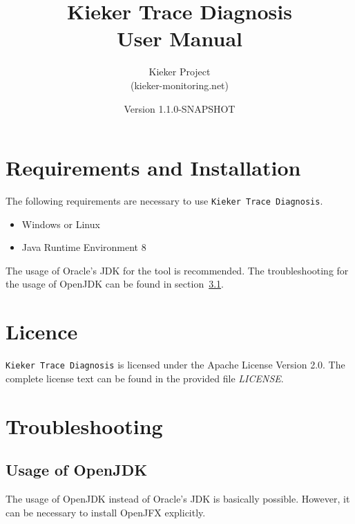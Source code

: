\documentclass{article}
\title{Kieker Trace Diagnosis\\User Manual}
\date{Version 1.1.0-SNAPSHOT}
\author{Kieker Project\\(kieker-monitoring.net)}
\begin{document}
  \newcommand{\KiekerTraceDiagnosis}[0]{\texttt{Kieker Trace Diagnosis}}
  \newcommand{\file}[1]{\textit{#1}}

  \maketitle

  \section{Requirements and Installation}
  The following requirements are necessary to use \KiekerTraceDiagnosis{}.
  \begin{itemize}
    \item Windows or Linux
    \item Java Runtime Environment 8
  \end{itemize}
  The usage of Oracle's JDK for the tool is recommended. The troubleshooting for the usage of OpenJDK can be found in section~\ref{OpenJDK}.

  \section{Licence}
  \KiekerTraceDiagnosis{} is licensed under the Apache License Version 2.0. The complete license text can be found in the provided file \file{LICENSE}.

  \section{Troubleshooting}

  \subsection{Usage of OpenJDK}\label{OpenJDK}
  The usage of OpenJDK instead of Oracle's JDK is basically possible. However, it can be necessary to install OpenJFX explicitly.
\end{document}
